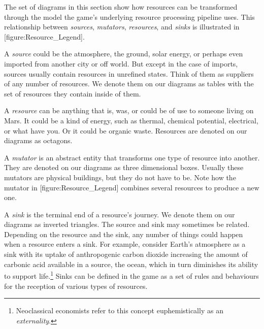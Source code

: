
The set of diagrams in this section show how resources can be transformed through the model the game's underlying resource processing pipeline uses. This relationship between {\it sources}, {\it mutators}, {\it resources}, and {\it sinks} is illustrated in [figure:Resource_Legend].

    {}
    
A {\it source} could be the atmosphere, the ground, solar energy, or perhaps even imported from another city or off world. But except in the case of imports, sources usually contain resources in unrefined states. Think of them as suppliers of any number of resources. We denote them on our diagrams as tables with the set of resources they contain inside of them.

A {\it resource} can be anything that is, was, or could be of use to someone living on Mars. It could be a kind of energy, such as thermal, chemical potential, electrical, or what have you. Or it could be organic waste. Resources are denoted on our diagrams as octagons.

A {\it mutator} is an abstract entity that transforms one type of resource into another. They are denoted on our diagrams as three dimensional boxes. Usually these mutators are physical buildings, but they do not have to be. Note how the mutator in [figure:Resource_Legend] combines several resources to produce a new one.

A {\it sink} is the terminal end of a resource's journey. We denote them on our diagrams as inverted triangles. The source and sink may sometimes be related. Depending on the resource and the sink, any number of things could happen when a resource enters a sink. For example, consider Earth's atmosphere as a sink with its uptake of anthropogenic carbon dioxide increasing the amount of carbonic acid available in a source, the ocean, which in turn diminishes its ability to support life.\footnote{Neoclassical economists refer to this concept euphemistically as an {\it externality}.} Sinks can be defined in the game as a set of rules and behaviours for the reception of various types of resources.

